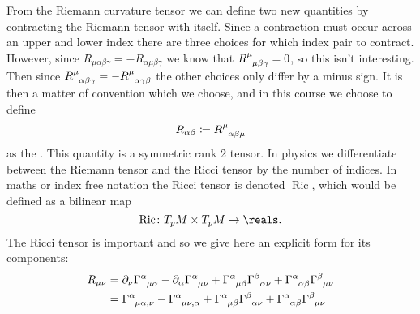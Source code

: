 \documentclass[fleqn]{NotesClass}
\newcommand*{\christoffel}[3]{\tensor{\Gamma}{^{#1}_{{#2}{#3}}}}
\begin{document}
    From the Riemann curvature tensor we can define two new quantities by contracting the Riemann tensor with itself.
    Since a contraction must occur across an upper and lower index there are three choices for which index pair to contract.
    However, since \(R_{\mu\alpha\beta\gamma} = -R_{\alpha\mu\beta\gamma}\) we know that \(\tensor{R}{^\mu_{\mu\beta\gamma}} = 0\), so this isn't interesting.
    Then since \(\tensor{R}{^\mu_{\alpha\beta\gamma}} = -\tensor{R}{^\mu_{\alpha\gamma\beta}}\) the other choices only differ by a minus sign.
    It is then a matter of convention which we choose, and in this course we choose to define
    \begin{equation}
        R_{\alpha\beta} \coloneqq \tensor{R}{^\mu_{\alpha\beta\mu}}
    \end{equation}
    as the .
    This quantity is a symmetric rank 2 tensor.
    In physics we differentiate between the Riemann tensor and the Ricci tensor by the number of indices.
    In maths or index free notation the Ricci tensor is denoted \(\mathop{\mathrm{Ric}}\), which would be defined as a bilinear map
    \begin{equation}
        \mathop{\mathrm{Ric}}\colon T_p M \times T_p M \to \reals.
    \end{equation}
    The Ricci tensor is important and so we give here an explicit form for its components:
    \begin{align}
        R_{\mu\nu} &= \partial_\nu \christoffel{\alpha}{\mu}{\alpha} - \partial_\alpha \christoffel{\alpha}{\mu}{\nu} + \christoffel{\alpha}{\mu}{\beta}\christoffel{\beta}{\alpha}{\nu} + \christoffel{\alpha}{\alpha}{\beta}\christoffel{\beta}{\mu}{\nu}\\
        &= \christoffel{\alpha}{\mu}{\alpha,\nu} - \christoffel{\alpha}{\mu}{\nu,\alpha} + \christoffel{\alpha}{\mu}{\beta}\christoffel{\beta}{\alpha}{\nu} + \christoffel{\alpha}{\alpha}{\beta}\christoffel{\beta}{\mu}{\nu}
    \end{align}
    
\end{document}
